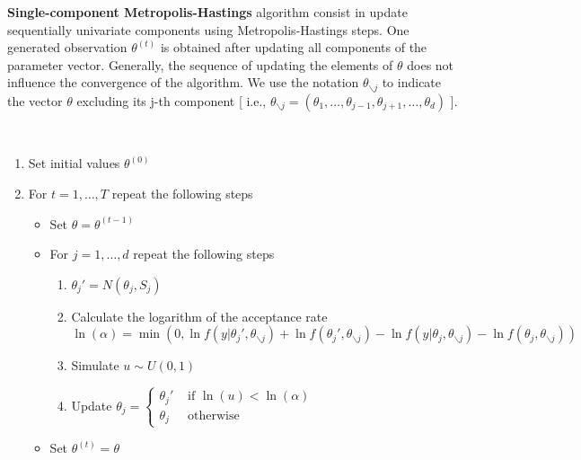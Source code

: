 \documentclass[11pt,fleqn]{book} %
\begin{document}
\textbf{Single-component Metropolis-Hastings} algorithm consist in update sequentially 
univariate components using Metropolis-Hastings steps. 
One generated observation $\theta^{(t)}$ is obtained after updating all 
components of the parameter vector. Generally, the sequence of updating the 
elements of $\theta$ does not influence the convergence of the algorithm.
We use the notation $\theta_{\backslash j}$ to indicate the vector $\theta$ 
excluding its j-th component [ i.e., $\theta_{\backslash j} = 
(\theta_1,\dots,\theta_{j-1},\theta_{j+1},\dots,\theta_{d})$ ].


\begin{algorithm} \ 
\begin{enumerate}
\item Set initial values $\theta^{(0)}$
\item For $t=1,\dots,T$ repeat the following steps
\begin{itemize}
\item Set $\theta=\theta^{(t-1)}$
\item For $j=1,\dots,d$ repeat the following steps
\begin{enumerate}[label=\alph*.]
\item $\theta_j' = N(\theta_j,S_j)$
\item Calculate the logarithm of the acceptance rate \\
      $\ln(\alpha) = \min \left( 0,
          \ln f(y|\theta_j',\theta_{\backslash j}) + 
          \ln f(\theta_j',\theta_{\backslash j}) - 
          \ln f(y|\theta_j,\theta_{\backslash j}) - 
          \ln f(\theta_j,\theta_{\backslash j})
       \right)$
\item Simulate $u \sim U(0,1)$
\item Update $\theta_j=\left\{
  \begin{array}{ll}
  \theta_j' & \textrm{ if } \ln(u) < \ln(\alpha) \\
  \theta_j  & \textrm{ otherwise }
  \end{array}\right.$ 
\end{enumerate}
\item Set $\theta^{(t)}=\theta$
\end{itemize}
\end{enumerate}
\end{algorithm}



\end{document}
